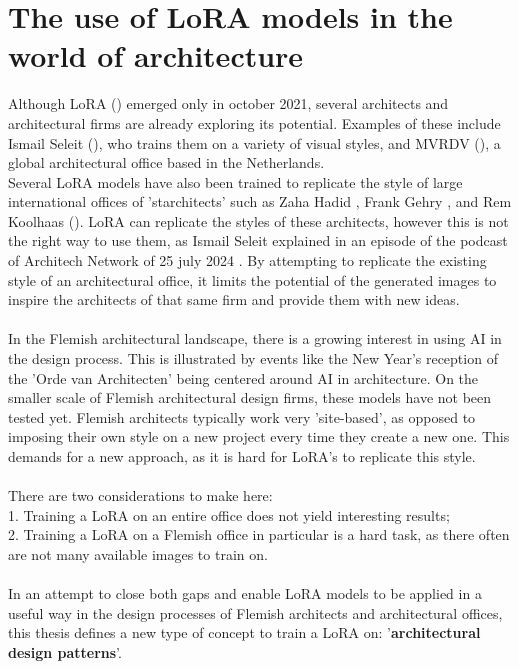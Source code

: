 \section{The use of LoRA models in the world of architecture}
Although LoRA (\cite{hu_lora_2021}) emerged only in october 2021, several architects and architectural firms are already exploring its potential. Examples of these include Ismail Seleit (\cite{ismail_seleit_home_nodate}), who trains them on a variety of visual styles, and MVRDV (\cite{show_it_better_how_2024}), a global architectural office based in the Netherlands. \\
Several LoRA models have also been trained to replicate the style of large international offices of 'starchitects' such as Zaha Hadid \autocite{tangbohu_designed_2025}, Frank Gehry \autocite{laushine_frankgehryincuprum-lora_flux-architecture_2024}, and Rem Koolhaas (\cite{tangbohu_designed_2024}). LoRA can replicate the styles of these architects, however this is not the right way to use them, as Ismail Seleit explained in an episode of the podcast of Architech Network of 25 july 2024 \autocite{architech_network_ep_2024}. By attempting to replicate the existing style of an architectural office, it limits the potential of the generated images to inspire the architects of that same firm and provide them with new ideas.\\
\\
In the Flemish architectural landscape, there is a growing interest in using AI in the design process. This is illustrated by events like the New Year's reception of the 'Orde van Architecten' being centered around AI in architecture. On the smaller scale of Flemish architectural design firms, these models have not been tested yet. Flemish architects typically work very 'site-based', as opposed to imposing their own style on a new project every time they create a new one. This demands for a new approach, as it is hard for LoRA's to replicate this style.\\
\\
There are two considerations to make here:\\ 
1. Training a LoRA on an entire office does not yield interesting results;\\
2. Training a LoRA on a Flemish office in particular is a hard task, as there often are not many available images to train on.\\
\\
In an attempt to close both gaps and enable LoRA models to be applied in a useful way in the design processes of Flemish architects and architectural offices, this thesis defines a new type of concept to train a LoRA on: '\textbf{architectural design patterns}'. \\
